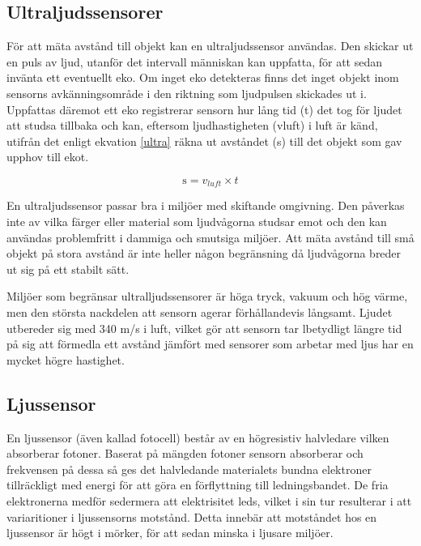 \documentclass[11pt]{article}
\begin{document}
\begin{flushleft}
\subsection{Ultraljudssensorer}
För att mäta avstånd till objekt kan en ultraljudssensor användas. Den skickar ut en puls av ljud, utanför det intervall människan kan uppfatta, för att sedan invänta ett eventuellt eko. Om inget eko detekteras finns det inget objekt inom sensorns avkänningsområde i den riktning som ljudpulsen skickades ut i. Uppfattas däremot ett eko registrerar sensorn hur lång tid (t) det tog för ljudet att studsa tillbaka och kan, eftersom ljudhastigheten (vluft) i luft är känd, utifrån det enligt ekvation \ref{ultra} räkna ut avståndet (s) till det objekt som gav upphov till ekot. \cite{Ultraljud}

\begin{equation}\label{ultra}
	\textrm{s} = v_{luft} \times t 				
\end{equation}

En ultraljudssensor passar bra i miljöer med skiftande omgivning. Den påverkas inte av vilka färger eller material som ljudvågorna studsar emot och den kan användas problemfritt i dammiga och smutsiga miljöer. Att mäta avstånd till små objekt på stora avstånd är inte heller någon begränsning då ljudvågorna breder ut sig på ett stabilt sätt. \cite{Ultraljud}

Miljöer som begränsar ultralljudssensorer är höga tryck, vakuum och hög värme, men den största nackdelen att sensorn agerar förhållandevis långsamt. Ljudet utbereder sig med 340 m/s i luft, vilket gör att sensorn tar lbetydligt längre tid på sig att förmedla ett avstånd jämfört med sensorer som arbetar med ljus har en mycket högre hastighet. \cite{Ultraljud}

\subsection{Ljussensor}
En ljussensor (även kallad fotocell) består av en högresistiv halvledare vilken absorberar fotoner. Baserat på mängden fotoner sensorn absorberar och frekvensen på dessa så ges det halvledande materialets bundna elektroner tillräckligt med energi för att göra en förflyttning till ledningsbandet. De fria elektronerna medför sedermera att elektrisitet leds,  vilket i sin tur resulterar i att variaritioner i ljussensorns motstånd. Detta innebär att motståndet hos en ljussensor är högt i mörker, för att sedan minska i ljusare miljöer. \cite{612896}


\end{flushleft}
\end{document}
